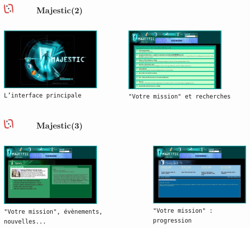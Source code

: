 \documentclass[slidetop,11pt]{beamer}
\def\sectionPartIIaV{Majestic}
\def\moreInFrameTitleLeftt{\includegraphics[height=0.5cm]{img/ligueludique-0.png}~~~~~}
\begin{document}
\begin{frame}
	\frametitle{\moreInFrameTitleLeftt \sectionPartIIaV (2) }
	\begin{columns}[T]
		\begin{column}[T]{5.05cm}
			\includegraphics[width=5.00cm]{img/majesticARGgame/majestic-screenshot-ME0000046986_2.jpg}~\\
			\texttt{\footnotesize L'interface principale }
		\end{column}
		\begin{column}[T]{5.05cm}
			\includegraphics[width=5.00cm]{img/majesticARGgame/majestic-screenshot-ME0000046985_2.jpg}~\\
			\texttt{\footnotesize "Votre mission" et recherches }
		\end{column}
	\end{columns}
\end{frame}

\begin{frame}
	\frametitle{\moreInFrameTitleLeftt \sectionPartIIaV (3) }
	\begin{columns}[T]
		\begin{column}[T]{5.05cm}
			\includegraphics[width=5.00cm]{img/majesticARGgame/majestic-screenshot-ME0000046987_2.jpg}~\\
			\texttt{\footnotesize "Votre mission", {\'e}v{\`e}nements, nouvelles... }
		\end{column}
		\begin{column}[T]{5.05cm}
			\includegraphics[width=5.00cm]{img/majesticARGgame/majestic-screenshot-ME0000046990_2.jpg}~\\
			\texttt{\footnotesize "Votre mission" : progression }
		\end{column}
	\end{columns}
\end{frame}
\end{document}
